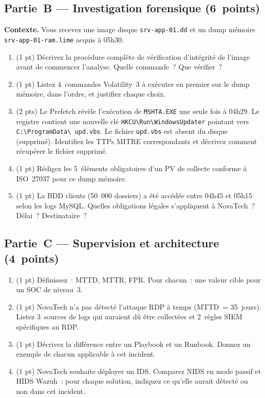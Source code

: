 \subsection{Partie~B --- Investigation forensique (6~points)}

\begin{boxexo}
\textbf{Contexte.}
Vous recevez une image disque \texttt{srv-app-01.dd} et un dump mémoire
\texttt{srv-app-01-ram.lime} acquis à 05h30.

\begin{enumerate}[label=\textbf{Q\arabic*.}]
  \item (1 pt) Décrivez la procédure complète de vérification d'intégrité
        de l'image avant de commencer l'analyse. Quelle commande~?
        Que vérifier~?
  \item (1 pt) Listez 4~commandes Volatility~3 à exécuter en premier
        sur le dump mémoire, dans l'ordre, et justifiez chaque choix.
  \item (2 pts) Le Prefetch révèle l'exécution de \texttt{MSHTA.EXE}
        une seule fois à 04h29. Le registre contient une nouvelle clé
        \texttt{HKCU\textbackslash Run\textbackslash WindowsUpdater}
        pointant vers \texttt{C:\textbackslash ProgramData\textbackslash
        upd.vbs}. Le fichier \texttt{upd.vbs} est absent du disque
        (supprimé). Identifiez les TTPs MITRE correspondants et décrivez
        comment récupérer le fichier supprimé.
  \item (1 pt) Rédigez les 5~éléments obligatoires d'un PV de collecte
        conforme à ISO~27037 pour ce dump mémoire.
  \item (1 pt) La BDD clients (50~000 dossiers) a été accédée entre
        04h45 et 05h15 selon les logs MySQL. Quelles obligations légales
        s'appliquent à NovaTech~? Délai~? Destinataire~?
\end{enumerate}
\end{boxexo}

\subsection{Partie~C --- Supervision et architecture (4~points)}

\begin{boxexo}
\begin{enumerate}[label=\textbf{Q\arabic*.}]
  \item (1 pt) Définissez~: MTTD, MTTR, FPR. Pour chacun~:
        une valeur cible pour un SOC de niveau~3.
  \item (1 pt) NovaTech n'a pas détecté l'attaque RDP à temps
        (MTTD~= 35~jours). Listez 3~sources de logs qui auraient
        dû être collectées et 2~règles SIEM spécifiques au RDP.
  \item (1 pt) Décrivez la différence entre un Playbook et un Runbook.
        Donnez un exemple de chacun applicable à cet incident.
  \item (1 pt) NovaTech souhaite déployer un IDS. Comparez NIDS en mode
        passif et HIDS Wazuh~: pour chaque solution, indiquez ce
        qu'elle aurait détecté ou non dans cet incident.
\end{enumerate}
\end{boxexo}

